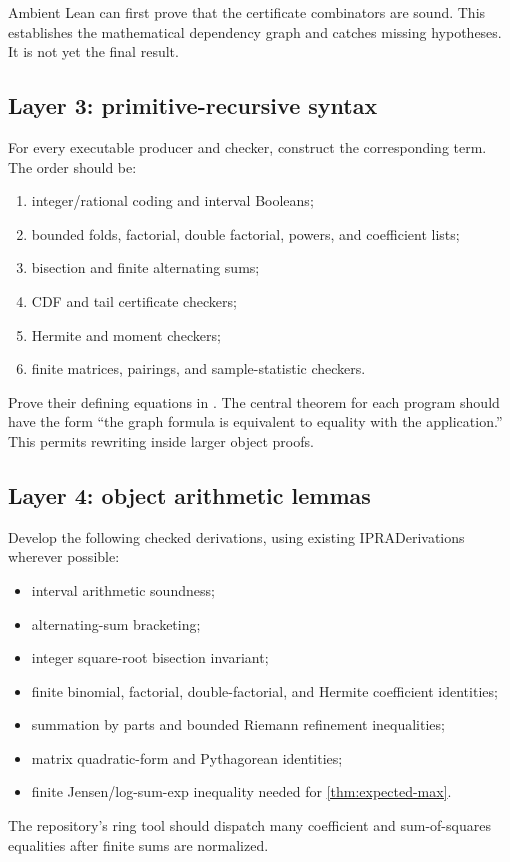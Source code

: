 Ambient Lean can first prove that the certificate combinators are sound.  This establishes the mathematical dependency graph and catches missing hypotheses.  It is not yet the final \ipra{} result.

\subsection{Layer 3: primitive-recursive syntax}

For every executable producer and checker, construct the corresponding  term.  The order should be:
\begin{enumerate}[label=(\roman*)]
  \item integer/rational coding and interval Booleans;
  \item bounded folds, factorial, double factorial, powers, and coefficient lists;
  \item bisection and finite alternating sums;
  \item CDF and tail certificate checkers;
  \item Hermite and moment checkers;
  \item finite matrices, pairings, and sample-statistic checkers.
\end{enumerate}
Prove their defining equations in .  The central theorem for each program should have the form ``the graph formula is equivalent to equality with the  application.''  This permits rewriting inside larger object proofs.

\subsection{Layer 4: object arithmetic lemmas}

Develop the following checked derivations, using existing IPRADerivations wherever possible:
\begin{itemize}
  \item interval arithmetic soundness;
  \item alternating-sum bracketing;
  \item integer square-root bisection invariant;
  \item finite binomial, factorial, double-factorial, and Hermite coefficient identities;
  \item summation by parts and bounded Riemann refinement inequalities;
  \item matrix quadratic-form and Pythagorean identities;
  \item finite Jensen/log-sum-exp inequality needed for \cref{thm:expected-max}.
\end{itemize}
The repository's ring tool should dispatch many coefficient and sum-of-squares equalities after finite sums are normalized.


